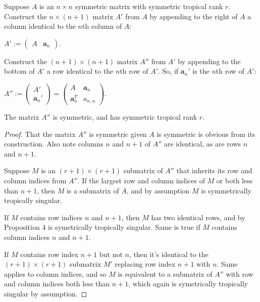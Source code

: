 \documentclass{article}
\begin{document}
\begin{lem}
  Suppose $A$ is an $n \times n$ symmetric matrix with symmetric tropical rank $r$. Construct the $n \times (n+1)$ matrix $A'$ from $A$ by appending to the right of $A$ a column identical to the $n$th column of $A$: 
  \begin{center}
    
    $A' := \left(\begin{array}{cc} A & \textbf{a}_{n} \end{array}\right)$.
    
  \end{center}
  Construct the $(n+1) \times (n+1)$ matrix $A''$ from $A'$ by appending to the bottom of $A'$ a row identical to the $n$th row of $A'$. So, if $\textbf{a}_{n}'$ is the $n$th row of $A'$:
  \begin{center}
    
    $A'' := \left(\begin{array}{c} A' \\ \textbf{a}_{n}' \end{array}\right) = \left(\begin{array}{cc} A & \textbf{a}_{n} \\ \textbf{a}_{n}^{T} & a_{n,n} \end{array}\right)$.
    
  \end{center}
  The matrix $A''$ is symmetric, and has symmetric tropical rank $r$.
\end{lem}

\begin{proof}
  That the matrix $A''$ is symmetric given $A$ is symmetric is obvious from its construction. Also note columns $n$ and $n+1$ of $A''$ are identical, as are rows $n$ and $n+1$.

  Suppose $M$ is an $(r+1) \times (r+1)$ submatrix of $A''$ that inherits its row and column indices from $A''$. If the largest row and column indices of $M$ or both less than $n+1$, then $M$ is a submatrix of $A$, and by assumption $M$ is symmetrically tropically singular.

  If $M$ contains row indices $n$ and $n+1$, then $M$ has two identical rows, and by Proposition 4 is symetrically tropically singular. Same is true if $M$ contains column indices $n$ and $n+1$.
  
  If $M$ contains row index $n+1$ but not $n$, then it's identical to the $(r+1) \times (r+1)$ submatrix $M'$ replacing row index $n+1$ with $n$. Same applies to column indices, and so $M$ is equivalent to a submatrix of $A''$ with row and column indices both less than $n+1$, which again is symetrically tropically singular by assumption.
\end{proof}
\end{document}
